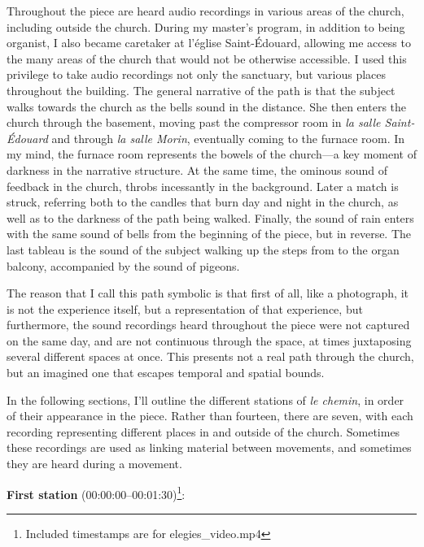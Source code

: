 \documentclass[12pt,twoside,maitrise]{dms_ks}
\theoremstyle{definition}
\begin{document}
{{Throughout the piece are heard audio recordings in various areas of the church, including outside the church. 
During my master's program, in addition to being organist, I also became caretaker at l'église Saint-Édouard, allowing me access to the many areas of the church that would not be otherwise accessible. 
I used this privilege to take audio recordings not only the sanctuary, but various places throughout the building. 
The general narrative of the path is that the subject walks towards the church as the bells sound in the distance. 
She then enters the church through the basement, moving past the compressor room in \textit{la salle Saint-Édouard} and through \textit{la salle Morin}, eventually coming to the furnace room. 
In my mind, the furnace room represents the bowels of the church---a key moment of darkness in the narrative structure. 
At the same time, the ominous sound of feedback in the church, throbs incessantly in the background. 
Later a match is struck, referring both to the candles that burn day and night in the church, as well as to the darkness of the path being walked. 
Finally, the sound of rain enters with the same sound of bells from the beginning of the piece, but in reverse. 
The last tableau is the sound of the subject walking up the steps from to the organ balcony, accompanied by the sound of pigeons.

The reason that I call this path symbolic is that first of all, like a photograph, it is not the experience itself, but a representation of that experience, but furthermore, the sound recordings heard throughout the piece were not captured on the same day, and are not continuous through the space, at times juxtaposing several different spaces at once. 
This presents not a real path through the church, but an imagined one that escapes temporal and spatial bounds.

In the following sections, I'll outline the different stations of \textit{le chemin}, in order of their appearance in the piece. 
Rather than fourteen, there are seven, with each recording representing different places in and outside of the church. 
Sometimes these recordings are used as linking material between movements, and sometimes they are heard during a movement.

\textbf{First station} (00:00:00--00:01:30)\footnote{Included timestamps are for elegies\_video.mp4}:

}}
\end{document}
